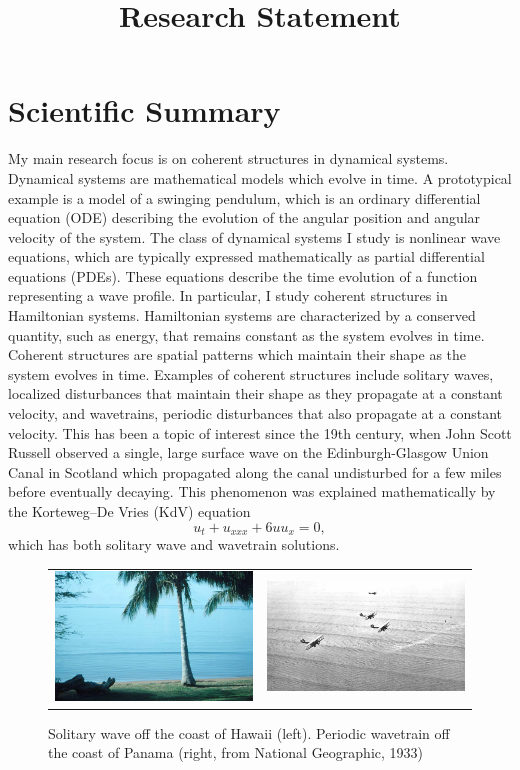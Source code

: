 \documentclass[12pt,reqno,oneside]{article}
\title{Research Statement}
\date{\vspace{-12ex}}
\begin{document}
\thispagestyle{empty}

\section*{Scientific Summary}

My main research focus is on coherent structures in dynamical systems. Dynamical systems are mathematical models which evolve in time. A prototypical example is a model of a swinging pendulum, which is an ordinary differential equation (ODE) describing the evolution of the angular position and angular velocity of the system. The class of dynamical systems I study is nonlinear wave equations, which are typically expressed mathematically as partial differential equations (PDEs). These equations describe the time evolution of a function representing a wave profile. In particular, I study coherent structures in Hamiltonian systems. 
Hamiltonian systems are characterized by a conserved quantity, such as energy, that remains constant as the system evolves in time. Coherent structures are spatial patterns which maintain their shape as the system evolves in time. Examples of coherent structures include solitary waves, localized disturbances that maintain their shape as they propagate at a constant velocity, and wavetrains, periodic disturbances that also propagate at a constant velocity. This has been a topic of interest since the 19th century, when John Scott Russell observed a single, large surface wave on the Edinburgh-Glasgow Union Canal in Scotland which propagated along the canal undisturbed for a few miles before eventually decaying. This phenomenon was explained mathematically by the Korteweg–De Vries (KdV) equation 
\[
u_t + u_{xxx} + 6 u u_x = 0,
\]
which has both solitary wave and wavetrain solutions.
\begin{figure}[H]
    \centering
    \begin{tabular}{cc}
        \includegraphics[width=7cm]{images/SolitaryWaveHawaii.png} &
        \includegraphics[width=7cm]{images/cnoidalwaves.png} 
    \end{tabular}
    \caption{Solitary wave off the coast of Hawaii \cite{Andriopoulos2009} (left). Periodic wavetrain off the coast of Panama (right, from National Geographic, 1933) }
    \label{fig:solitarywaves}
\end{figure}
\end{document}
